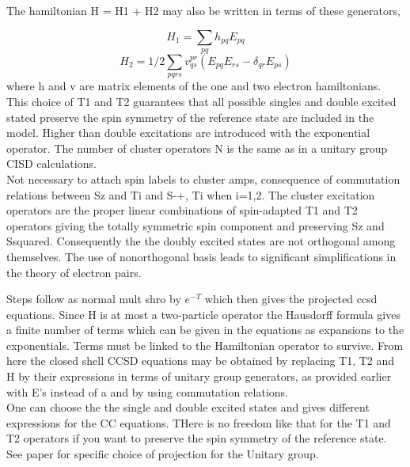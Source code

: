 \documentclass[10pt, draft]{article}
\begin{document}
 The hamiltonian H = H1 + H2 may also be written in terms of these generators,
 
 \[H_1 = \sum_{pq} h_{pq}E_{pq}\]
 \[H_2 = 1/2 \sum_{pqrs} v_{qs}^{pr}(E_{pq}E_{rs} - \delta_{qr}E_{ps})\]
  where h and v are matrix elements of the one and two electron hamiltonians.\\
  This choice of T1 and T2 guarantees that all possible singles and double excited stated preserve the spin symmetry of the reference state are included in the model.  Higher than double excitations are introduced with the exponential operator.  The number of cluster operators N is the same as in a unitary group CISD calculations.\\
  Not necessary to attach spin labels to cluster amps, consequence of commutation relations between Sz and Ti and S-+, Ti when i=1,2.  The cluster excitation operators are the proper linear combinations of spin-adapted T1 and T2 operators giving the totally symmetric spin component and preserving Sz and Ssquared.  Consequently the the doubly excited states are not orthogonal among themselves.  The use of nonorthogonal basis leads to significant simplifications in the theory of electron pairs.  \linebreak[1]
  
  Steps follow as normal mult shro by $e^{-T}$ which then gives the projected ccsd equations. Since H is at most a two-particle operator the Hausdorff formula gives a finite number of terms which can be given in the equations as expansions to the exponentials. Terms must be linked to the Hamiltonian operator to survive.   From here the closed shell CCSD equations may be obtained by replacing T1, T2 and H by their expressions in terms of unitary group generators, as provided earlier with E's instead of a and by using commutation relations.  \\
  One can choose the the single and double excited states and gives different expressions for the CC equations.  THere is no freedom like that for the T1 and T2 operators if you want to preserve the spin symmetry of the reference state.  \\
  See paper for specific choice of projection for the Unitary group.
  
  
\end{document}
